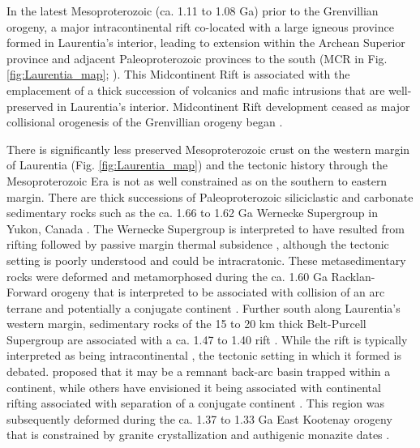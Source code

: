\documentclass[twocolumn, switch]{article} %
\begin{document}
In the latest Mesoproterozoic (ca. 1.11 to 1.08 Ga) prior to the Grenvillian orogeny, a major intracontinental rift co-located with a large igneous province formed in Laurentia's interior, leading to extension within the Archean Superior province and adjacent Paleoproterozoic provinces to the south (MCR in Fig. \ref{fig:Laurentia_map}; \citealp{Cannon1992b}). This Midcontinent Rift is associated with the emplacement of a thick succession of volcanics and mafic intrusions that are well-preserved in Laurentia's interior. Midcontinent Rift development ceased as major collisional orogenesis of the Grenvillian orogeny began \citep{Cannon1994a, Swanson-Hysell2019a}.

There is significantly less preserved Mesoproterozoic crust on the western margin of Laurentia (Fig. \ref{fig:Laurentia_map}) and the tectonic history through the Mesoproterozoic Era is not as well constrained as on the southern to eastern margin. There are thick successions of Paleoproterozoic siliciclastic and carbonate sedimentary rocks such as the ca. 1.66 to 1.62 Ga Wernecke Supergroup in Yukon, Canada \citep{Delaney1986a, Furlanetto2016a}. The Wernecke Supergroup is interpreted to have resulted from rifting followed by passive margin thermal subsidence \citep{Furlanetto2016a}, although the tectonic setting is poorly understood and could be intracratonic. These metasedimentary rocks were deformed and metamorphosed during the ca. 1.60 Ga Racklan-Forward orogeny that is interpreted to be associated with collision of an arc terrane and potentially a conjugate continent \citep{Thorkelson2005a, Furlanetto2013a, Furlanetto2016a}. Further south along Laurentia's western margin, sedimentary rocks of the 15 to 20 km thick Belt-Purcell Supergroup are associated with a ca. 1.47 to 1.40 rift \citep{Evans2000c}. While the rift is typically interpreted as being intracontinental \citep{Lydon2004a}, the tectonic setting in which it formed is debated. \citet{Hoffman1989c} proposed that it may be a remnant back-arc basin trapped within a continent, while others have envisioned it being associated with continental rifting associated with separation of a conjugate continent \citep{Jones2015a}. This region was subsequently deformed during the ca. 1.37 to 1.33 Ga East Kootenay orogeny that is constrained by granite crystallization and authigenic monazite dates \citep{McMechan1982a, Nesheim2012a, McFarlane2015a}.
\end{document}
